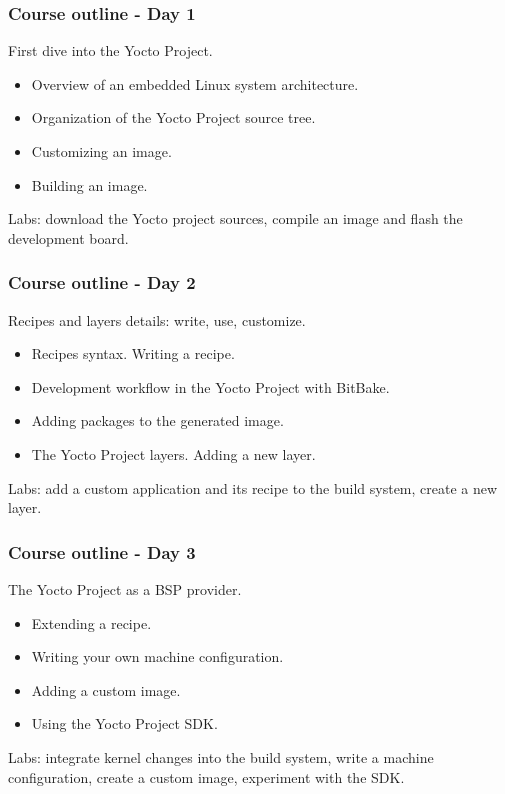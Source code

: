 \begin{frame}
\frametitle{Course outline - Day 1}
First dive into the Yocto Project.
\begin{itemize}
\item Overview of an embedded Linux system architecture.
\item Organization of the Yocto Project source tree.
\item Customizing an image.
\item Building an image.
\end{itemize}
Labs: download the Yocto project sources, compile an image and flash
the development board.
\end{frame}

\begin{frame}
\frametitle{Course outline - Day 2}
Recipes and layers details: write, use, customize.
\begin{itemize}
\item Recipes syntax. Writing a recipe.
\item Development workflow in the Yocto Project with BitBake.
\item Adding packages to the generated image.
\item The Yocto Project layers. Adding a new layer.
\end{itemize}
Labs: add a custom application and its recipe to the build system,
create a new layer.
\end{frame}

\begin{frame}
\frametitle{Course outline - Day 3}
The Yocto Project as a BSP provider.
\begin{itemize}
\item Extending a recipe.
\item Writing your own machine configuration.
\item Adding a custom image.
\item Using the Yocto Project SDK.
\end{itemize}
Labs: integrate kernel changes into the build system, write a machine
configuration, create a custom image, experiment with the SDK.
\end{frame}
